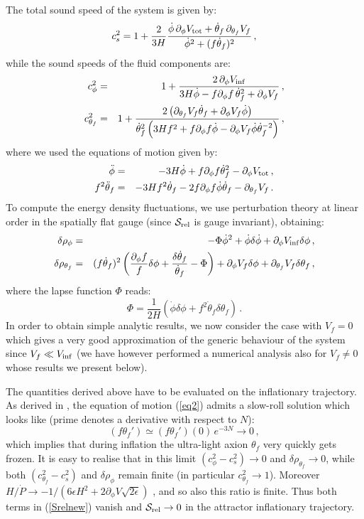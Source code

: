 \documentclass[aps,prd,a4paper,twocolumn,amsmath,showpacs,superscriptaddress,nofootinbib,preprintnumbers]{revtex4-1}
\newcommand{\be}{\begin{equation}}
\newcommand{\ee}{\end{equation}}
\newcommand{\bea}{\begin{eqnarray}}
\newcommand{\eea}{\end{eqnarray}}
\newcommand{\mc}{\mathcal}
\begin{document}
The total sound speed of the system is given by:
\be
c_s^2=1+\frac{2}{3H}\frac{\dot\phi\,\partial_\phi V_{\rm tot}  + \dot\theta_f\,\partial_{\theta_f} V_f }{\dot\phi^2 +(f\dot\theta_f)^2}\,,
\ee
while the sound speeds of the fluid components are:
\bea
c_\phi^2&=&1+\frac{2\,\partial_\phi V_{\rm inf}}{3H\dot\phi-f \partial_\phi f\, \dot\theta_f^2 + \partial_\phi V_f}\,, \nonumber \\
c_{\theta_f}^2&=&1+\frac{2\left( \partial_{\theta_f} V_f \dot\theta_f+ \partial_\phi V_f\dot\phi\right)}{\dot\theta_f^2 \left( 3H f^2+ f \partial_\phi f \dot\phi -\partial_\phi V_f \dot\phi\dot\theta_f^{-2}\right)}\,,
\eea
where we used the equations of motion given by:
\bea
\ddot\phi &=& -3H\dot\phi +f\partial_\phi f \dot\theta_f^2-\partial_\phi V_{\rm tot}\,,  \\
f^2\ddot\theta_f &=& -3H f^2\dot\theta_f-2 f\partial_\phi f \dot\phi\dot\theta_f-\partial_{\theta_f} V_f\,.
\label{eq2}
\eea
To compute the energy density fluctuations, we use perturbation theory at linear order in the spatially flat gauge (since $\mc{S}_{\rm rel}$ is gauge invariant), obtaining:
\bea
\delta\rho_\phi&=&-\Phi \dot\phi^2 + \dot\phi \delta\dot\phi  +\partial_\phi V_{\rm inf} \delta\phi\,,  \\
\delta\rho_{\theta_f}&=& (f \dot\theta_f)^2 \left(\frac{\partial_\phi f}{f}\delta\phi +\frac{\delta\dot\theta_f}{\dot\theta_f}-\Phi \right)+ \partial_\phi V_f \delta\phi+\partial_{\theta_f} V_f \delta\theta_f \,, \nonumber
\eea
where the lapse function $\Phi$ reads:
\be 
\Phi=\frac{1}{2H}\left(\dot\phi \delta\phi + f^2  \dot\theta_f \delta\theta_f\right)\,.
\ee
In order to obtain simple analytic results, we now consider the case with $V_f=0$ which gives a very good approximation of the generic behaviour of the system since $V_f\ll V_{\rm inf}$ (we have however performed a numerical analysis also for $V_f\neq 0$ whose results we present below). 

The quantities derived above have to be evaluated on the inflationary trajectory. As derived in \cite{Cicoli:2018ccr}, the equation of motion (\ref{eq2}) admits a slow-roll solution which looks like (prime denotes a derivative with respect to $N$):
\be
(f\theta_f')\simeq (f\theta_f')(0)\,e^{-3N} \to 0\,, 
\ee
which implies that during inflation the ultra-light axion $\theta_f$ very quickly gets frozen. It is easy to realise that in this limit $(c_\phi^2 - c_s^2)\to 0$ and $\delta\rho_{\theta_f}\to 0$, while both $(c_{\theta_f}^2-c_s^2)$ and $\delta\rho_\phi$ remain finite (in particular $c_{\theta_f}^2\to 1$). Moreover $H/\dot P\to -1/\left(6\epsilon H^2 + 2 \partial_\phi V \sqrt{2\epsilon} \right)$ , and so also this ratio is finite. Thus both terms in (\ref{Srelnew}) vanish and $\mc{S}_{\rm rel}\to 0$ in the attractor inflationary trajectory.
\end{document}
